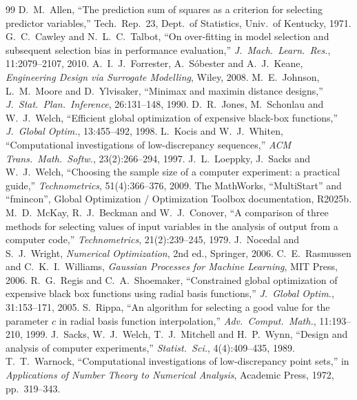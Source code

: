 \documentclass[11pt,a4paper]{article}
\begin{document}
\small
\begin{thebibliography}{99}
\setlength{\itemsep}{0pt}
 D.~M.~Allen, ``The prediction sum of squares as a criterion for selecting predictor variables,'' Tech.\ Rep.\ 23, Dept.\ of Statistics, Univ.\ of Kentucky, 1971.
 G.~C.~Cawley and N.~L.~C.~Talbot, ``On over-fitting in model selection and subsequent selection bias in performance evaluation,'' \emph{J.\ Mach.\ Learn.\ Res.}, 11:2079--2107, 2010.
 A.~I.~J.~Forrester, A.~S\'obester and A.~J.~Keane, \emph{Engineering Design via Surrogate Modelling}, Wiley, 2008.
 M.~E.~Johnson, L.~M.~Moore and D.~Ylvisaker, ``Minimax and maximin distance designs,'' \emph{J.\ Stat.\ Plan.\ Inference}, 26:131--148, 1990.
 D.~R.~Jones, M.~Schonlau and W.~J.~Welch, ``Efficient global optimization of expensive black-box functions,'' \emph{J.\ Global Optim.}, 13:455--492, 1998.
 L.~Kocis and W.~J.~Whiten, ``Computational investigations of low-discrepancy sequences,'' \emph{ACM Trans.\ Math.\ Softw.}, 23(2):266--294, 1997.
 J.~L.~Loeppky, J.~Sacks and W.~J.~Welch, ``Choosing the sample size of a computer experiment: a practical guide,'' \emph{Technometrics}, 51(4):366--376, 2009.
 The MathWorks, ``MultiStart'' and ``fmincon'', Global Optimization / Optimization Toolbox documentation, R2025b.
 M.~D.~McKay, R.~J.~Beckman and W.~J.~Conover, ``A comparison of three methods for selecting values of input variables in the analysis of output from a computer code,'' \emph{Technometrics}, 21(2):239--245, 1979.
 J.~Nocedal and S.~J.~Wright, \emph{Numerical Optimization}, 2nd ed., Springer, 2006.
 C.~E.~Rasmussen and C.~K.~I.~Williams, \emph{Gaussian Processes for Machine Learning}, MIT Press, 2006.
 R.~G.~Regis and C.~A.~Shoemaker, ``Constrained global optimization of expensive black box functions using radial basis functions,'' \emph{J.\ Global Optim.}, 31:153--171, 2005.
 S.~Rippa, ``An algorithm for selecting a good value for the parameter $c$ in radial basis function interpolation,'' \emph{Adv.\ Comput.\ Math.}, 11:193--210, 1999.
 J.~Sacks, W.~J.~Welch, T.~J.~Mitchell and H.~P.~Wynn, ``Design and analysis of computer experiments,'' \emph{Statist.\ Sci.}, 4(4):409--435, 1989.
 T.~T.~Warnock, ``Computational investigations of low-discrepancy point sets,'' in \emph{Applications of Number Theory to Numerical Analysis}, Academic Press, 1972, pp.~319--343.
\end{thebibliography}
\end{document}
